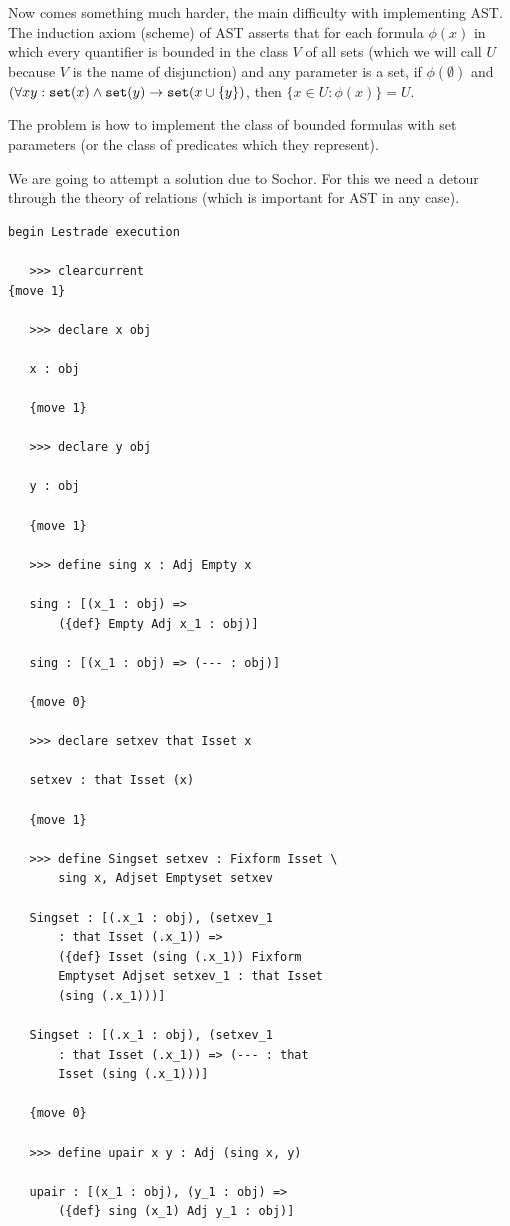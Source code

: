 \documentclass[12pt]{article}
\begin{document}
Now comes something much harder, the main difficulty with implementing AST.  The induction axiom (scheme) of AST asserts that for each formula $\phi(x)$ in which every quantifier is bounded in the class $V$ of all sets (which we will call $U$ because $V$ is the name of disjunction) and any parameter is a set, if $\phi(\emptyset)$ and $(\forall xy:{\tt set}(x) \wedge {\tt set}(y) \rightarrow {\tt set}(x \cup \{y\})$, then $\{x \in U:\phi(x)\} = U$.

The problem is how to implement the class of bounded formulas with set parameters (or the class of predicates which they represent).

We are going to attempt a solution due to Sochor.  For this we need a detour through the theory of relations
(which is important for AST in any case).

\begin{verbatim}
begin Lestrade execution

   >>> clearcurrent
{move 1}

   >>> declare x obj

   x : obj

   {move 1}

   >>> declare y obj

   y : obj

   {move 1}

   >>> define sing x : Adj Empty x

   sing : [(x_1 : obj) => 
       ({def} Empty Adj x_1 : obj)]

   sing : [(x_1 : obj) => (--- : obj)]

   {move 0}

   >>> declare setxev that Isset x

   setxev : that Isset (x)

   {move 1}

   >>> define Singset setxev : Fixform Isset \
       sing x, Adjset Emptyset setxev

   Singset : [(.x_1 : obj), (setxev_1 
       : that Isset (.x_1)) => 
       ({def} Isset (sing (.x_1)) Fixform 
       Emptyset Adjset setxev_1 : that Isset 
       (sing (.x_1)))]

   Singset : [(.x_1 : obj), (setxev_1 
       : that Isset (.x_1)) => (--- : that 
       Isset (sing (.x_1)))]

   {move 0}

   >>> define upair x y : Adj (sing x, y)

   upair : [(x_1 : obj), (y_1 : obj) => 
       ({def} sing (x_1) Adj y_1 : obj)]


\end{verbatim}
\end{document}
